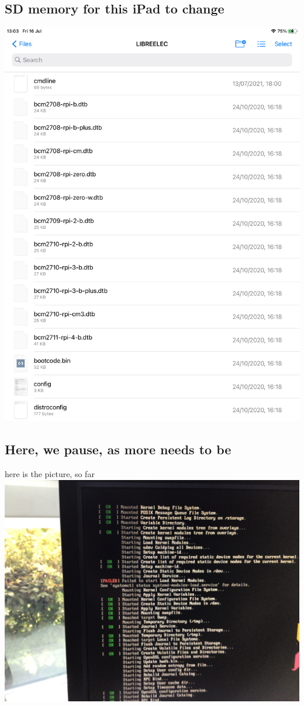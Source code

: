 \documentclass[11pt]{article}
\begin{document}
\subsection{SD memory for this iPad to change}
\label{sec-1-3}

\includegraphics[width=.9\linewidth]{./i/6.png}
\subsection{Here, we pause, as more needs to be}
\label{sec-1-4}

   here is the picture, so far
\includegraphics[width=.9\linewidth]{./i/e0.jpg}
\end{document}
